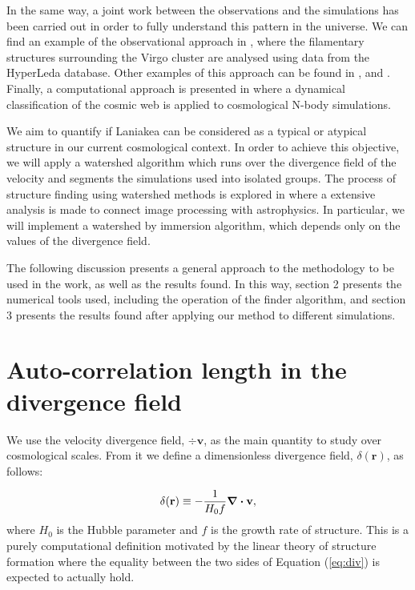 \documentclass[usenatbib]{mnras}
\begin{document}
In the same way, a joint work between the
observations and the simulations has been carried out in order to
fully understand this pattern in the universe. We can find an example
of the observational approach in \cite{Kim_2016}, where the
filamentary structures surrounding the Virgo cluster are analysed
using data from the HyperLeda database. 
Other examples of this
approach can be found in \cite{Santiago_Bautista_2020},
\cite{van_de_Weygaert_2014} and \cite{Lares_2017}. Finally, a
computational approach is presented in
\cite{10.1111/j.1365-2966.2009.14885.x} where a dynamical
classification of the cosmic web is applied to cosmological N-body
simulations.  

We aim to quantify if Laniakea can be considered as a typical or atypical 
structure in our current cosmological context. In order to achieve
this objective, we will apply a watershed algorithm
\citep{BeucherWatershed1979} which runs over the divergence field of
the velocity and segments the simulations used into isolated
groups. The process of structure finding using watershed methods is
explored in \cite{10.1111/j.1365-2966.2007.12125.x} where a extensive
analysis is made to connect image processing with astrophysics. In
particular, we will implement a watershed by immersion algorithm,
which depends only on the values of the divergence field.  

The following discussion presents a general approach to the
methodology to be used in the work, as well as the results found. In
this way, section 2 presents the numerical tools used, including the
operation of the finder algorithm, and section 3 presents the results
found after applying our method to different simulations. 




\section{Auto-correlation length in the divergence field}

We use the velocity divergence field, $\div \textbf{v}$, as the main quantity to study over cosmological scales.
From it we define a dimensionless divergence field, $\delta(\textbf{r})$, as follows:

\begin{equation}
    \delta (\textbf{r})\equiv -\frac{1}{H_0 f} \div \bf{v},
    \label{eq:div}
\end{equation}
where $H_0$ is the Hubble parameter and $f$ is the growth rate of structure.
This is a purely computational definition motivated by the linear theory of structure formation where the equality between the two sides of Equation (\ref{eq:div}) is expected to actually hold.
\end{document}
